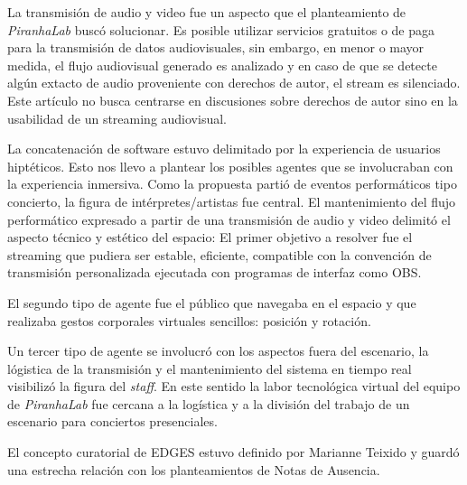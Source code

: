 La transmisión de audio y video fue un aspecto que el planteamiento de \textit{PiranhaLab} buscó solucionar. Es posible utilizar servicios gratuitos o de paga para la transmisión de datos audiovisuales, sin embargo, en menor o mayor medida, el flujo audiovisual generado es analizado y en caso de que se detecte algún extacto de audio proveniente con derechos de autor, el stream es silenciado. Este artículo no busca centrarse en discusiones sobre derechos de autor sino en la usabilidad de un streaming audiovisual. 

La concatenación de software estuvo delimitado por la experiencia de usuarios hiptéticos. Esto nos llevo a plantear los posibles agentes que se involucraban con la experiencia inmersiva. Como la propuesta partió de eventos performáticos tipo concierto, la figura de intérpretes/artistas fue central. El mantenimiento del flujo performático expresado a partir de una transmisión de audio y video delimitó el aspecto técnico y estético del espacio: El primer objetivo a resolver fue el streaming que pudiera ser estable, eficiente, compatible con la convención de transmisión personalizada ejecutada con programas de interfaz como OBS.

El segundo tipo de agente fue el público que navegaba en el espacio y que realizaba gestos corporales virtuales sencillos: posición y rotación. 

Un tercer tipo de agente se involucró con los aspectos fuera del escenario, la lógistica de la transmisión y el mantenimiento del sistema en tiempo real visibilizó la figura del \textit{staff}. En este sentido la labor tecnológica virtual del equipo de \textit{PiranhaLab} fue cercana a la logística y a la división del trabajo de un escenario para conciertos presenciales. 

El concepto curatorial de EDGES estuvo definido por Marianne Teixido y guardó una estrecha relación con los planteamientos de Notas de Ausencia.  %

\iffalse
- Uso de espacios tridimensionales 
- Bots y literatura 
- Datos que transforman el espacio   
- Ensayos digitales en la web
- cyberfeminisimo
- audio virtualmente posicionado 
- streaming de audio y video sin plataformas privativas - decisiones de optimización
- Según yo aquí usamos icecast y liquid soap 
- Inicios de multiplayer
\fi
